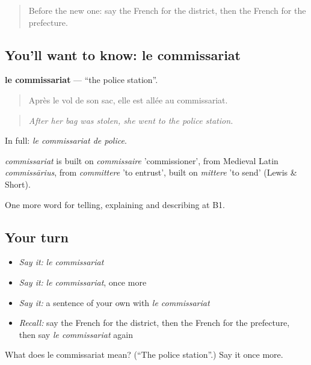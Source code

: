 \begin{quote}
Before the new one: say the French for the district, then the French for the prefecture.
\end{quote}

\subsection*{You'll want to know: le commissariat}
\textbf{le commissariat} — \textquotedblleft{}the police station\textquotedblright{}.

\begin{quote}
Après le vol de son sac, elle est allée au commissariat.
\end{quote}

\begin{quote}
\emph{After her bag was stolen, she went to the police station.}
\end{quote}

In full: \emph{le commissariat de police}.

\begin{cousinweb}
\emph{commissariat} is built on \emph{commissaire} 'commissioner', from Medieval Latin \emph{commissārius}, from \emph{committere} 'to entrust', built on \emph{mittere} 'to send' (Lewis \& Short).
\end{cousinweb}

\begin{grammarlens}[title={What you've built}]
One more word for telling, explaining and describing at B1.
\end{grammarlens}

\subsection*{Your turn}
\begin{itemize}
\raggedright
  \item \emph{Say it:} \emph{le commissariat}
  \item \emph{Say it:} \emph{le commissariat}, once more
  \item \emph{Say it:} a sentence of your own with \emph{le commissariat}
  \item \emph{Recall:} say the French for the district, then the French for the prefecture, then say \emph{le commissariat} again
\end{itemize}

\begin{tcolorbox}[breakable,colback=teal!4,colframe=teal!35!black,title={Before you move on}]
What does le commissariat mean? (\textquotedblleft{}The police station\textquotedblright{}.) Say it once more.
\end{tcolorbox}
